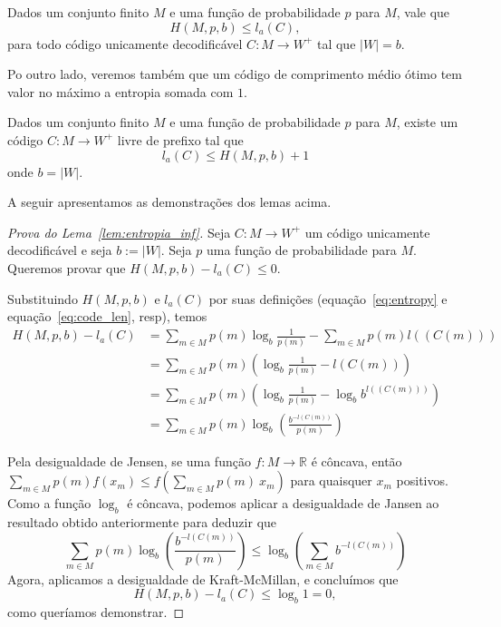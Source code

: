 \begin{lemma}
  \label{lem:entropia_inf}
  Dados um conjunto finito $M$ e uma função de probabilidade $p$ para
  $M$, vale que
\begin{equation*}
  H(M, p, b) \leq l_a(C),
\end{equation*}
para todo código unicamente decodificável $C:M\to W^+$ tal que $|W| =
b$.
\end{lemma}

Po outro lado, veremos também que um código de comprimento médio ótimo
tem valor no máximo a entropia somada com $1$.

\begin{lemma}
  \label{lem:entropia_sup}
  Dados um conjunto finito $M$ e uma função de probabilidade $p$ para
  $M$, existe um código $C:M\to W^+$ livre de prefixo tal que
  \begin{equation*}
    l_a(C) \leq H(M, p, b) + 1
  \end{equation*}
  onde $b = |W|$.
\end{lemma}

  A seguir apresentamos as demonstrações dos lemas acima.
  
  \begin{proof}[Prova do Lema~\ref{lem:entropia_inf}]
    Seja $C:M\to W^+$ um código unicamente decodificável e seja $b :=
    |W|$. Seja $p$ uma função de probabilidade para $M$. Queremos
    provar que $H(M, p,b) - l_a(C) \leq 0$.

    Substituindo $H(M,p, b)$ e $l_a(C)$ por suas definições
    (equação~\eqref{eq:entropy} e equação~\eqref{eq:code_len}, resp),
    temos
    \begin{align*}
      H(M, p, b) - l_a(C)
      &=
      \sum_{m \in M} p(m) \log_b \frac{1}{p(m)}
      - \sum_{m \in M}^{}p(m) l((C(m))) \\
      &=
      \sum_{m \in M} p(m) \left(
      \log_b \frac{1}{p(m)} - l(C(m))
      \right) \\
      &=
      \sum_{m \in M} p(m) \left(
      \log_b \frac{1}{p(m)} - \log_b b^{l((C(m)))}
      \right) \\
      &= \sum_{m \in M}^{}p(m) \log_b \left(\frac{b^{-l(C(m))}}{p(m)}\right)
    \end{align*}

    Pela desigualdade de Jensen, se uma função $f:M\to\mathbb{R}$ é
    côncava, então $\sum_{m\in M} p(m) f(x_m) \leq f(\sum_{m\in M}
    p(m)~x_m)$ para quaisquer $x_m$ positivos. Como a função $\log_b$
    é côncava, podemos aplicar a desigualdade de Jansen ao resultado
    obtido anteriormente para deduzir que
\begin{equation*}
  \sum_{m \in M}^{}p(m) \log_b  \left(\frac{b^{-l(C(m))}}{p(m)}\right)
  \leq
  \log_b\left(\sum_{m \in M} b^{-l(C(m))}\right)
\end{equation*}
Agora, aplicamos a desigualdade de Kraft-McMillan, e concluímos que
\begin{equation*}
  H(M, p, b) - l_a(C)
  \leq
  \log_b 1 = 0,
\end{equation*}
como queríamos demonstrar.
\end{proof}


